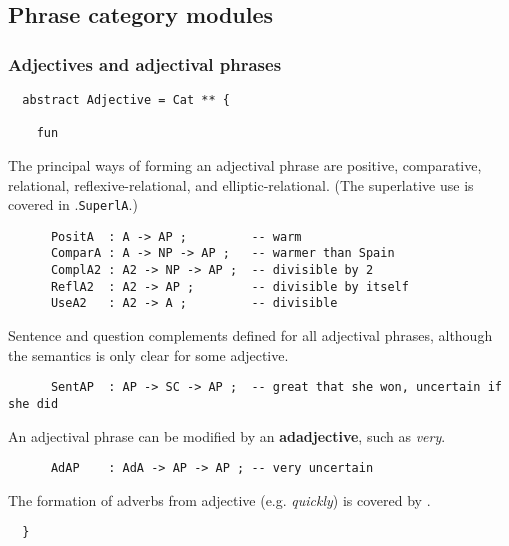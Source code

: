 \documentclass[11pt,a4paper]{article}
\newcommand{\commOut}[1]{}
\begin{document}
\subsection{Phrase category modules}
\commOut{Produced by 
gfdoc - a rudimentary GF document generator.
(c) Aarne Ranta (\htmladdnormallink{aarne@cs.chalmers.se}{mailto:aarne@cs.chalmers.se}) 2002 under GNU GPL.}


\subsubsection{Adjectives and adjectival phrases}
\begin{verbatim}
  abstract Adjective = Cat ** {
  
    fun
\end{verbatim}

The principal ways of forming an adjectival phrase are
positive, comparative, relational, reflexive-relational, and
elliptic-relational.
(The superlative use is covered in .\texttt{SuperlA}.)

\begin{verbatim}
      PositA  : A -> AP ;         -- warm
      ComparA : A -> NP -> AP ;   -- warmer than Spain
      ComplA2 : A2 -> NP -> AP ;  -- divisible by 2
      ReflA2  : A2 -> AP ;        -- divisible by itself
      UseA2   : A2 -> A ;         -- divisible
\end{verbatim}

Sentence and question complements defined for all adjectival
phrases, although the semantics is only clear for some adjective.

\begin{verbatim}
      SentAP  : AP -> SC -> AP ;  -- great that she won, uncertain if she did
\end{verbatim}

An adjectival phrase can be modified by an \textbf{adadjective}, such as \textit{very}.

\begin{verbatim}
      AdAP    : AdA -> AP -> AP ; -- very uncertain
\end{verbatim}

The formation of adverbs from adjective (e.g. \textit{quickly}) is covered
by .

\begin{verbatim}
  }
\end{verbatim}

\commOut{Produced by 
gfdoc - a rudimentary GF document generator.
(c) Aarne Ranta (\htmladdnormallink{aarne@cs.chalmers.se}{mailto:aarne@cs.chalmers.se}) 2002 under GNU GPL.}
\end{document}
